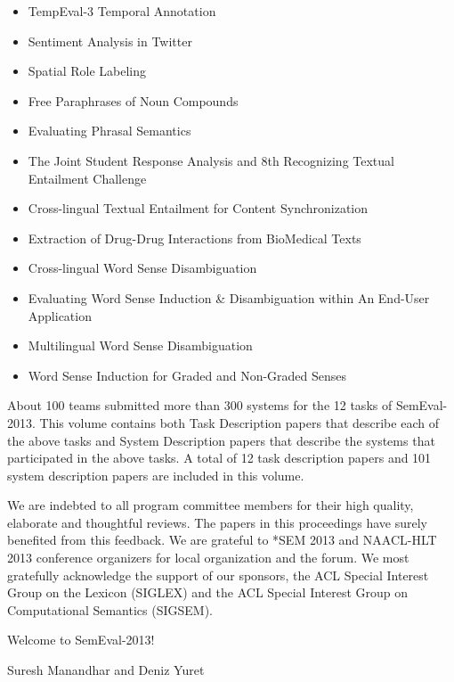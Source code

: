\begin{itemize}

\item TempEval-3 Temporal Annotation

\item Sentiment Analysis in Twitter

\item Spatial Role Labeling

\item Free Paraphrases of Noun Compounds

\item Evaluating Phrasal Semantics

\item The Joint Student Response Analysis and 8th Recognizing Textual Entailment Challenge

\item Cross-lingual Textual Entailment for Content Synchronization

\item Extraction of Drug-Drug Interactions from BioMedical Texts

\item Cross-lingual Word Sense Disambiguation

\item Evaluating Word Sense Induction \& Disambiguation within An End-User Application

\item Multilingual Word Sense Disambiguation

\item Word Sense Induction for Graded and Non-Graded Senses

\end{itemize}

About 100 teams submitted more than 300 systems for the 12 tasks of SemEval-2013.  This volume contains both Task Description papers that describe each of the above tasks and System Description papers that describe the systems that participated in the above tasks. A total of 12 task description papers and 101 system description papers are included in this volume.

We are indebted to all program committee members for their high quality, elaborate and thoughtful reviews. The papers in this proceedings have surely benefited from this feedback.  We are grateful to *SEM 2013 and NAACL-HLT 2013 conference organizers for local organization and the forum. We most gratefully acknowledge the support of our sponsors, the ACL Special Interest Group on the Lexicon (SIGLEX) and the ACL Special Interest Group on Computational Semantics (SIGSEM).

Welcome to SemEval-2013!

Suresh Manandhar and Deniz Yuret

\cleardoublepage

